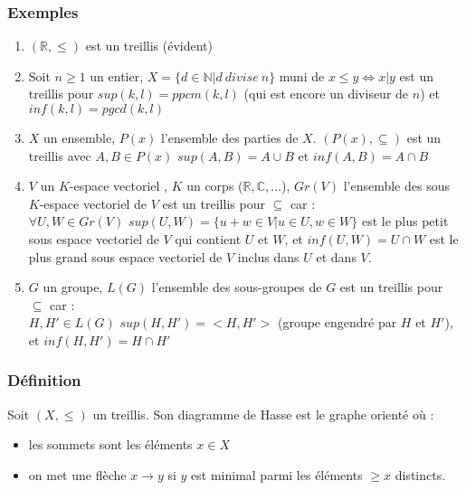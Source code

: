 \documentclass[a4paper, oneside]{report}
\newcommand{\R}{\mathbb{R}}
\newcommand{\N}{\mathbb{N}}
\newcommand{\C}{\mathbb{C}}
\newcommand{\sev}{sous espace vectoriel }
\newcommand{\ev}{espace vectoriel }
\begin{document}
\subsubsection{Exemples}
\begin{enumerate}
\item $(\R , \leq)$ est un treillis (évident)
\item Soit $n\geq 1$ un entier, $X=\{d\in \N | d~divise~n \}$ muni de $x\leq y \Leftrightarrow x|y$ est un treillis pour $sup(k,l)=ppcm(k,l)$ (qui est encore un diviseur de $n$) et $inf(k,l)=pgcd(k,l)$
\item $X$ un ensemble, $P(x)$ l'ensemble des parties de $X$. $(P(x),\subseteq)$ est un treillis avec $A,B\in P(x)$ $sup(A,B)=A\cup B$ et $inf(A,B)=A\cap B$
\item $V$ un $K$-\ev, $K$ un corps ($\R,\C,...$), $Gr(V)$ l'ensemble des sous $K$-\ev de $V$ est un treillis pour $\subseteq$ car :\\
$\forall U,W\in Gr(V)$ $sup(U,W)=\{u+w\in V |u\in U,w\in W \}$ est le plus petit \sev de $V$ qui contient $U$ et $W$, et $inf(U,W)=U\cap W$ est le plus grand \sev de $V$ inclus dans $U$ et dans $V$.\\
\item $G$ un groupe, $L(G)$ l'ensemble des sous-groupes de $G$ est un treillis pour $\subseteq$ car :\\
$H,H'\in L(G)$ $sup(H,H')=<H,H'>$ (groupe engendré par $H$ et $H'$), et $inf(H,H')=H\cap H'$
\end{enumerate}

\subsubsection{Définition}
Soit $(X,\leq )$ un treillis. Son diagramme de Hasse est le graphe orienté où :
\begin{itemize}
\item les sommets sont les éléments $x\in X$
\item on met une flèche $x\rightarrow y$ si $y$ est minimal parmi les éléments $\geq x$ distincts.
\end{itemize}
\end{document}
